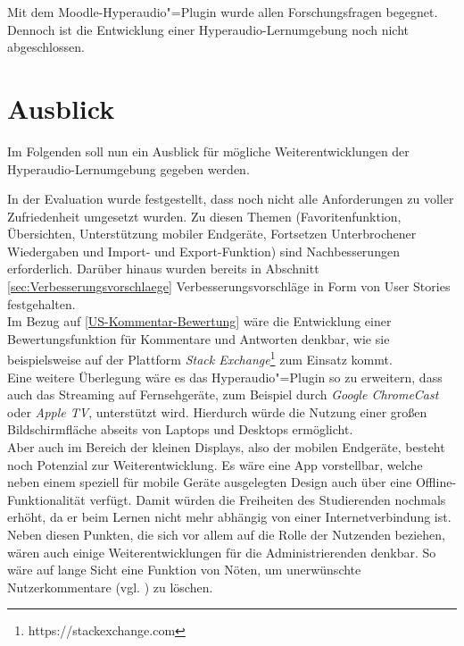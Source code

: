 Mit dem Moodle-Hyperaudio"=Plugin wurde allen Forschungsfragen begegnet. Dennoch ist die Entwicklung einer Hyperaudio-Lernumgebung noch nicht abgeschlossen.

\section{Ausblick}

Im Folgenden soll nun ein Ausblick für mögliche Weiterentwicklungen der Hyperaudio-Lernumgebung gegeben werden.

In der Evaluation wurde festgestellt, dass noch nicht alle Anforderungen zu voller Zufriedenheit umgesetzt wurden. Zu diesen Themen (Favoritenfunktion, Übersichten, Unterstützung mobiler Endgeräte, Fortsetzen Unterbrochener Wiedergaben und Import- und Export-Funktion) sind Nachbesserungen erforderlich. Darüber hinaus wurden bereits in Abschnitt \ref{sec:Verbesserungsvorschlaege} Verbesserungsvorschläge in Form von User Stories festgehalten.\\
Im Bezug auf \ref{US-Kommentar-Bewertung} wäre die Entwicklung einer Bewertungsfunktion für Kommentare und Antworten denkbar, wie sie beispielsweise auf der Plattform \textit{Stack Exchange}\footnote{https://stackexchange.com} zum Einsatz kommt.\\
Eine weitere Überlegung wäre es das Hyperaudio"=Plugin so zu erweitern, dass auch das Streaming auf Fernsehgeräte, zum Beispiel durch \textit{Google ChromeCast} oder \textit{Apple TV}, unterstützt wird. Hierdurch würde die Nutzung einer großen Bildschirmfläche abseits von Laptops und Desktops ermöglicht.\\
Aber auch im Bereich der kleinen Displays, also der mobilen Endgeräte, besteht noch Potenzial zur Weiterentwicklung. Es wäre eine App vorstellbar, welche neben einem speziell für mobile Geräte ausgelegten Design auch über eine Offline-Funktionalität verfügt. Damit würden die Freiheiten des Studierenden nochmals erhöht, da er beim Lernen nicht mehr abhängig von einer Internetverbindung ist.\\
Neben diesen Punkten, die sich vor allem auf die Rolle der Nutzenden beziehen, wären auch einige Weiterentwicklungen für die Administrierenden denkbar. So wäre auf lange Sicht eine Funktion von Nöten, um unerwünschte Nutzerkommentare (vgl. \cite{reinmann2002analyse}) zu löschen.\\
